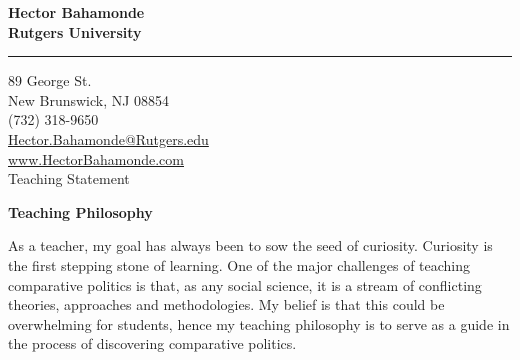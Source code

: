 \documentclass[11pt]{letter} %
\date{}
\begin{document}

\begin{letter}{} 


\begin{center}
\large\bf Hector Bahamonde \\ %
Rutgers University\\
\vspace{20pt} \hrule height 1pt %
89 George St. \\ New Brunswick, NJ 08854 \\ (732) 318-9650 \\ 
\href{mailto:hector.bahamonde@rutgers.edu}{Hector.Bahamonde@Rutgers.edu} \\
\href{http://www.hectorbahamonde.com}{www.HectorBahamonde.com}\\

{\huge\vspace{8mm} Teaching Statement}
\end{center} 

\signature{\vspace{1cm}h.b., fall 2016} %

\opening{} 
 
 {\bf Teaching Philosophy}

As a teacher, my goal has always been to sow the seed of curiosity. Curiosity is the first stepping stone of learning. One of the major challenges of teaching comparative politics is that, as any social science, it is a stream of conflicting theories, approaches and methodologies. My belief is that this could be overwhelming for students, hence my teaching philosophy is to serve as a guide in the process of discovering comparative politics.


\end{letter}
\end{document}
